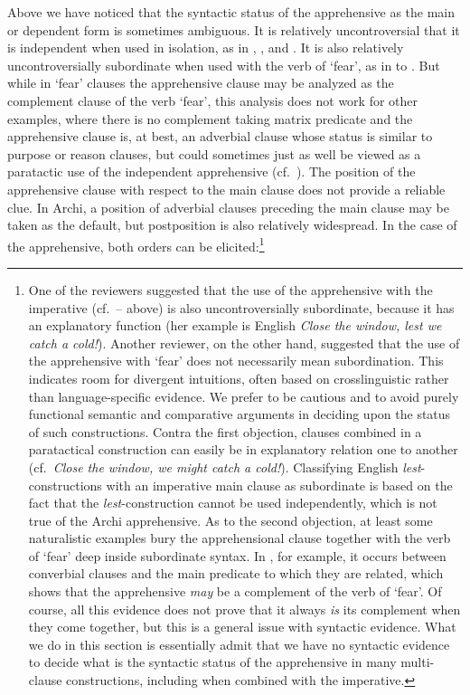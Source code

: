 \documentclass[output=paper,colorlinks,citecolor=brown]{langscibook}
\begin{document}
Above we have noticed that the syntactic status of the apprehensive as the main or dependent form is sometimes ambiguous. It is relatively uncontroversial that it is independent when used in isolation, as in , ,  and . It is also relatively uncontroversially subordinate when used with the verb of `fear', as in  to . But while in `fear' clauses the apprehensive clause may be analyzed as the complement clause of the verb `fear', this analysis does not work for other examples, where there is no complement taking matrix predicate and the apprehensive clause is, at best, an adverbial clause whose status is similar to purpose or reason clauses, but could sometimes just as well be viewed as a paratactic use of the independent apprehensive (cf.\ ). The position of the apprehensive clause with respect to the main clause does not provide a reliable clue. In Archi, a position of adverbial clauses preceding the main clause may be taken as the default, but postposition is also relatively widespread. In the case of the apprehensive, both orders can be elicited:\footnote{One of the reviewers suggested that the use of the apprehensive with the imperative (cf.\ -- above) is also uncontroversially subordinate, because it has an explanatory function (her example is English \textit{Close the window, lest we catch a cold!}). Another reviewer, on the other hand, suggested that the use of the apprehensive with `fear' does not necessarily mean subordination. This indicates room for divergent intuitions, often based on crosslinguistic rather than language-specific evidence. We prefer to be cautious and to avoid purely functional semantic and comparative arguments in deciding upon the status of such constructions. Contra the first objection, clauses combined in a paratactical construction can easily be in explanatory relation one to another (cf.\ \textit{Close the window, we might catch a cold!}). Classifying English \textit{lest}-constructions with an imperative main clause as subordinate is based on the fact that the \textit{lest}-construction cannot be used independently, which is not true of the Archi apprehensive. As to the second objection, at least some naturalistic examples bury the apprehensional clause together with the verb of `fear' deep inside subordinate syntax. In , for example, it occurs between converbial clauses and the main predicate to which they are related, which shows that the apprehensive \textit{may} be a complement of the verb of `fear'. Of course, all this evidence does not prove that it always \textit{is} its complement when they come together, but this is a general issue with syntactic evidence. What we do in this section is essentially admit that we have no syntactic evidence to decide what is the syntactic status of the apprehensive in many multi-clause constructions, including when combined with the imperative.}
\end{document}

